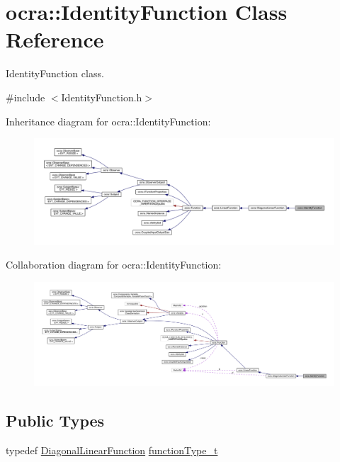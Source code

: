 \hypertarget{classocra_1_1IdentityFunction}{}\section{ocra\+:\+:Identity\+Function Class Reference}
\label{classocra_1_1IdentityFunction}


Identity\+Function class.  




{\ttfamily \#include $<$Identity\+Function.\+h$>$}



Inheritance diagram for ocra\+:\+:Identity\+Function\+:\nopagebreak
\begin{figure}[H]
\begin{center}
\leavevmode
\includegraphics[width=350pt]{db/d8b/classocra_1_1IdentityFunction__inherit__graph}
\end{center}
\end{figure}


Collaboration diagram for ocra\+:\+:Identity\+Function\+:\nopagebreak
\begin{figure}[H]
\begin{center}
\leavevmode
\includegraphics[width=350pt]{d7/d34/classocra_1_1IdentityFunction__coll__graph}
\end{center}
\end{figure}
\subsection*{Public Types}
\begin{DoxyCompactItemize}
\item 
typedef \hyperlink{classocra_1_1DiagonalLinearFunction}{Diagonal\+Linear\+Function} \hyperlink{classocra_1_1IdentityFunction_a4598384746d901d0a13b712666288894}{function\+Type\+\_\+t}
\end{DoxyCompactItemize}
